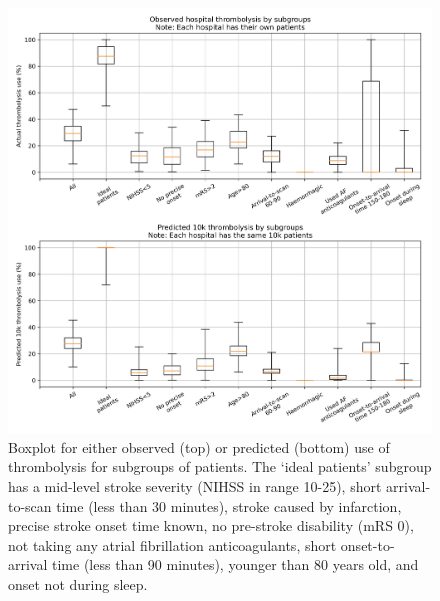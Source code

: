
\begin{figure}[!h]
\centering
\includegraphics[width=1\textwidth]{./images/15a_xgb_10_features_10k_cohort_actual_vs_modelled_subgroup_violin}
\caption{Boxplot for either observed (top) or predicted (bottom) use of thrombolysis for subgroups of patients. The `ideal patients' subgroup has a mid-level stroke severity (NIHSS in range 10-25), short arrival-to-scan time (less than 30 minutes), stroke caused by infarction, precise stroke onset time known, no pre-stroke disability (mRS 0), not taking any atrial fibrillation anticoagulants, short onset-to-arrival time (less than 90 minutes), younger than 80 years old, and onset not during sleep.}
\label{fig:results_boxplot}
\end{figure}
\newpage





